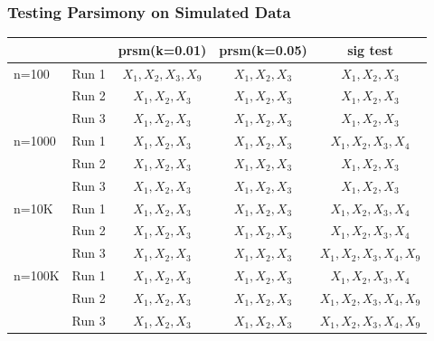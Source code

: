 \documentclass{beamer}
\begin{document}
\begin{frame}
\frametitle{Testing Parsimony on Simulated Data}

\begin{tabular}{| l  r | c | c | c |}

\hline

	&&	prsm(k=0.01)&	prsm(k=0.05)&	sig test	\\
\hline

n=100&	Run 1&	$X_1 ,X_2, X_3, X_9$&	$X_1, X_2, X_3$&		$X_1, X_2, X_3$	\\
	&	Run 2&	$X_1, X_2, X_3$&		$X_1, X_2, X_3$&		$X_1, X_2, X_3$	\\
	&	Run 3&	$X_1, X_2, X_3$&		$X_1, X_2, X_3$&		$X_1, X_2, X_3$	\\

\hline

n=1000&	Run 1&	$X_1, X_2, X_3$&		$X_1, X_2, X_3$&		$X_1, X_2, X_3, X_4$	\\
	&	Run 2&	$X_1, X_2, X_3$&		$X_1, X_2, X_3$&		$X_1, X_2, X_3$		\\
	&	Run 3&	$X_1, X_2, X_3$&		$X_1, X_2, X_3$&		$X_1, X_2, X_3$		\\
	
\hline
			
n=10K&	Run 1&	$X_1, X_2, X_3$&		$X_1, X_2, X_3$&		$X_1, X_2, X_3, X_4$		\\
	&	Run 2&	$X_1, X_2, X_3$&		$X_1, X_2, X_3$&		$X_1, X_2, X_3, X_4$		\\
	&	Run 3&	$X_1, X_2, X_3$&		$X_1, X_2, X_3$&		$X_1, X_2, X_3, X_4, X_9$		\\

\hline
			
n=100K&	Run 1&	$X_1, X_2, X_3$&		$X_1, X_2, X_3$&		$X_1, X_2, X_3, X_4$		\\
	&	Run 2&	$X_1, X_2, X_3$&		$X_1, X_2, X_3$&		$X_1, X_2, X_3, X_4, X_9$		\\
	&	Run 3&	$X_1, X_2, X_3$&		$X_1, X_2, X_3$&		$X_1, X_2, X_3, X_4, X_9$		\\

\hline

\end{tabular}


\end{frame}
\end{document}
